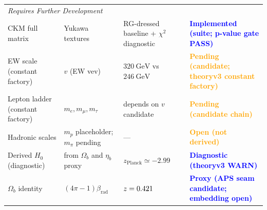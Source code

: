 \begin{longtable}{@{}p{3cm}p{4cm}p{3cm}p{5.2cm}@{}}
\midrule
\multicolumn{4}{l}{\textit{Requires Further Development}}\\
\quad CKM full matrix & Yukawa textures & RG-dressed baseline + $\chi^2$ diagnostic & \textcolor{blue}{\textbf{Implemented (suite; p-value gate PASS)}}\\
\quad EW scale (constant factory) & $v$ (EW vev) & $320~\mathrm{GeV}$ vs $246~\mathrm{GeV}$ & \textcolor{orange}{\textbf{Pending (candidate; theoryv3 constant factory)}}\\
\quad Lepton ladder (constant factory) & $m_e, m_\mu, m_\tau$ & depends on $v$ candidate & \textcolor{orange}{\textbf{Pending (candidate chain)}}\\
\quad Hadronic scales & $m_p$ placeholder; $m_\pi$ pending & --- & \textcolor{orange}{\textbf{Open (not derived)}}\\
\quad Derived $H_0$ (diagnostic) & from $\Omega_b$ and $\eta_b$ proxy & $z_{\mathrm{Planck}}\simeq -2.99$ & \textcolor{blue}{\textbf{Diagnostic (theoryv3 WARN)}}\\
\quad $\Omega_b$ identity & $(4\pi-1)\beta_{\text{rad}}$ & $z=\num[round-mode=places,round-precision=3]{\TFPTOmegaBZ}$ & \textcolor{blue}{\textbf{Proxy (APS seam candidate; embedding open)}}\\
\end{longtable}
\endgroup

